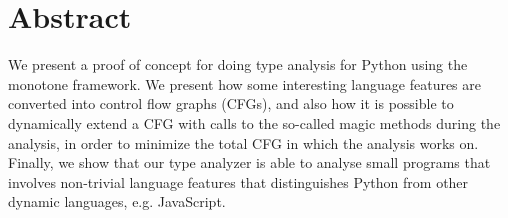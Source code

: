 \chapter*{Abstract}
We present a proof of concept for doing type analysis for Python using the monotone framework. We present how some interesting language features are converted into control flow graphs (CFGs), and also how it is possible to dynamically extend a CFG with calls to the so-called magic methods during the analysis, in order to minimize the total CFG in which the analysis works on. Finally, we show that our type analyzer is able to analyse small programs that involves non-trivial language features that distinguishes Python from other dynamic languages, e.g. JavaScript.